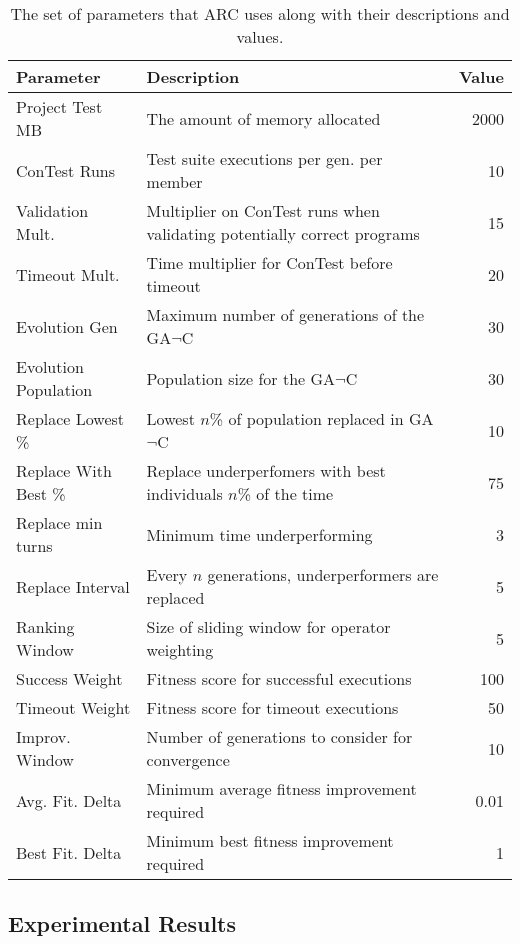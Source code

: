 \documentclass{llncs}
\begin{document}
\begin{table}[t!]
\caption{The set of parameters that ARC uses along with their descriptions and values.}
\begin{center}
\lstset{basicstyle=\scriptsize}
\begin{tabular}{|l|p{7.5cm}|r|}
\hline
\textbf{Parameter} & \textbf{Description} & \textbf{Value}\\
\hline
Project Test MB & The amount of memory allocated  & 2000\\
\hline
ConTest Runs & Test suite executions per gen. per member & 10\\
\hline
Validation Mult. & Multiplier on ConTest runs when validating potentially correct programs & 15\\
\hline
Timeout Mult. & Time multiplier for ConTest before timeout & 20\\
\hline
Evolution Gen & Maximum number of generations of the GA$\neg$C & 30\\
\hline
Evolution Population & Population size for the GA$\neg$C & 30\\
\hline
Replace Lowest \% & Lowest $n$\% of population replaced in GA$\neg$C & 10\\
\hline
Replace With Best \% & Replace underperfomers with best individuals $n$\% of the time & 75\\
\hline
Replace min turns & Minimum time underperforming & 3\\
\hline
Replace Interval & Every $n$ generations, underperformers are replaced & 5\\
\hline
Ranking Window & Size of sliding window for operator weighting & 5\\
\hline
Success Weight & Fitness score for successful executions & 100\\
\hline
Timeout Weight & Fitness score for timeout executions & 50\\
\hline
Improv. Window & Number of generations to consider for convergence & 10\\
\hline
Avg. Fit. Delta & Minimum average fitness improvement required & 0.01\\
\hline
Best Fit. Delta & Minimum best fitness improvement required & 1\\
\hline
\end{tabular}
\label{tbl:used_parameters}
\end{center}
\end{table}

\subsection{Experimental Results}
\label{sec:experimental_results}
\end{document}
